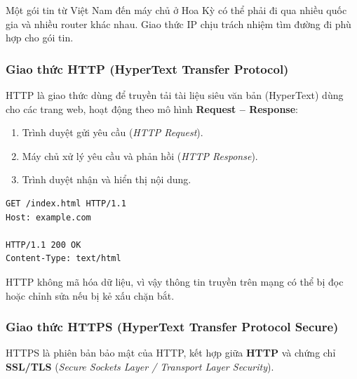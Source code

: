 \begin{noteBox}
Một gói tin từ Việt Nam đến máy chủ ở Hoa Kỳ có thể phải đi qua nhiều quốc gia và nhiều router khác nhau. Giao thức IP chịu trách nhiệm tìm đường đi phù hợp cho gói tin.
\end{noteBox}

\subsubsection{Giao thức HTTP (HyperText Transfer Protocol)}

HTTP là giao thức dùng để truyền tải tài liệu siêu văn bản (HyperText) dùng cho các trang web, hoạt động theo mô hình \textbf{Request -- Response}:
\begin{enumerate}[label=\textbf{\arabic*.}, leftmargin=1.8em, itemsep=2pt, parsep=0pt]
    \item Trình duyệt gửi yêu cầu (\textit{HTTP Request}).
    \item Máy chủ xử lý yêu cầu và phản hồi (\textit{HTTP Response}).
    \item Trình duyệt nhận và hiển thị nội dung.
\end{enumerate}

\begin{codeWindow}
\begin{lstlisting}[language=HTTP, frame=none]
GET /index.html HTTP/1.1
Host: example.com

HTTP/1.1 200 OK
Content-Type: text/html
\end{lstlisting}
\end{codeWindow}

\begin{warnBox}
HTTP không mã hóa dữ liệu, vì vậy thông tin truyền trên mạng có thể bị đọc hoặc chỉnh sửa nếu bị kẻ xấu chặn bắt.
\end{warnBox}

\subsubsection{Giao thức HTTPS (HyperText Transfer Protocol Secure)}

HTTPS là phiên bản bảo mật của HTTP, kết hợp giữa \textbf{HTTP} và chứng chỉ \textbf{SSL/TLS} (\textit{Secure Sockets Layer / Transport Layer Security}).

